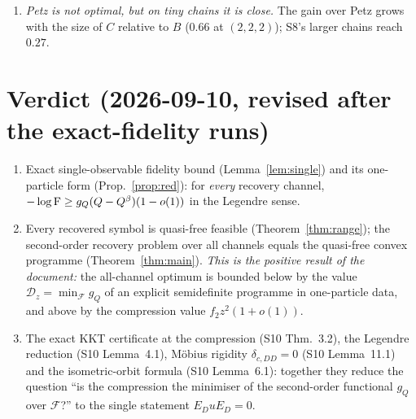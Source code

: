 \documentclass[11pt,a4paper]{article}
\begin{document}
\begin{enumerate}[leftmargin=1.6em,itemsep=1pt]
the boundary, \(|s^*|<10^{-9}\), as it must: both constraints are active there).  Random parity-covariant \emph{isometric} channels \(E(\rho)=W\rho W^*\) --- extreme points of the
channel set, with recovered states at trace distance \(1.3\)--\(1.5\) from Gaussian and
\(-\log\Fid\) between \(0.47\) and \(1.56\) --- also pass, with slack \(s^*\in[-0.16,-0.05]\)
(twelve trials on the two geometries).  Note that the lattice lacks the type-III ingredient of Lemma~\ref{lem:domain}, so this is a
consistency check of the conclusion, not of the proof.
\item \emph{Petz is not optimal, but on tiny chains it is close.}  The gain over Petz grows with the
size of \(C\) relative to \(B\) (\(0.66\) at \((2,2,2)\)); S8's larger chains reach \(0.27\).
\end{enumerate}


\section{Verdict (2026-09-10, revised after the exact-fidelity runs)}\label{sec:verdict}

\begin{verdictok}
\begin{enumerate}[leftmargin=1.6em,itemsep=1pt]
\item Exact single-observable fidelity bound (Lemma~\ref{lem:single}) and its one-particle form
(Prop.~\ref{prop:red}): for \emph{every} recovery channel, \(-\log\operatorname{F}\ge g_Q(Q-Q^\beta)(1-o(1))\) in
the Legendre sense.
\item Every recovered symbol is quasi-free feasible (Theorem~\ref{thm:range}); the second-order
recovery problem over all channels equals the quasi-free convex programme (Theorem~\ref{thm:main}).
\emph{This is the positive result of the document:} the all-channel optimum is bounded below by the
value \(\mathcal D_z=\min_{\mathcal F}g_Q\) of an explicit semidefinite programme in one-particle data, and
above by the compression value \(f_2z^2(1+o(1))\).
\item The exact KKT certificate at the compression (S10 Thm.~3.2), the Legendre reduction (S10
Lemma~4.1), M\"obius rigidity \(\delta_{c,DD}=0\) (S10 Lemma~11.1) and the isometric-orbit formula
(S10 Lemma~6.1): together they reduce the question ``is the compression the minimiser of the
second-order functional \(g_Q\) over \(\mathcal F\)?'' to the single statement \(E_DuE_D=0\).
\end{enumerate}
\end{verdictok}
\end{document}
